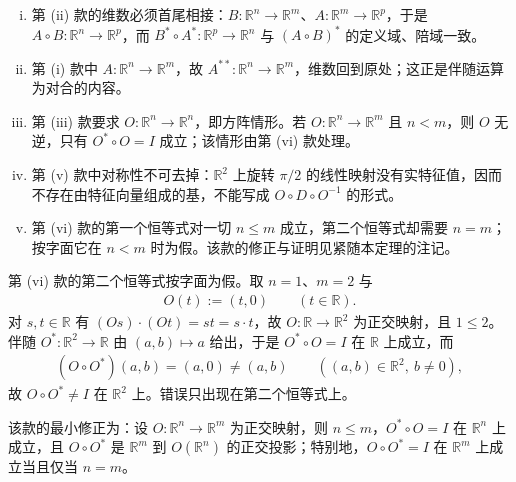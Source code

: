 \documentclass[../../main.tex]{subfiles}%
\begin{document}
\begin{remark}\label{remark:ch03-thm-3-4-条件}
\begin{enumerate}[(i)]
\item 第 (ii) 款的维数必须首尾相接：$B:\mathbb{R}^n\to\mathbb{R}^m$、$A:\mathbb{R}^m\to\mathbb{R}^p$，于是 $A\circ B:\mathbb{R}^n\to\mathbb{R}^p$，而 $B^*\circ A^*:\mathbb{R}^p\to\mathbb{R}^n$ 与 $(A\circ B)^*$ 的定义域、陪域一致。
\item 第 (i) 款中 $A:\mathbb{R}^n\to\mathbb{R}^m$，故 $A^{**}:\mathbb{R}^n\to\mathbb{R}^m$，维数回到原处；这正是伴随运算为对合的内容。
\item 第 (iii) 款要求 $O:\mathbb{R}^n\to\mathbb{R}^n$，即方阵情形。若 $O:\mathbb{R}^n\to\mathbb{R}^m$ 且 $n<m$，则 $O$ 无逆，只有 $O^*\circ O=I$ 成立；该情形由第 (vi) 款处理。
\item 第 (v) 款中对称性不可去掉：$\mathbb{R}^2$ 上旋转 $\pi/2$ 的线性映射没有实特征值，因而不存在由特征向量组成的基，不能写成 $O\circ D\circ O^{-1}$ 的形式。
\item 第 (vi) 款的第一个恒等式对一切 $n\leqslant m$ 成立，第二个恒等式却需要 $n=m$；按字面它在 $n<m$ 时为假。该款的修正与证明见紧随本定理的注记。
\end{enumerate}
\end{remark}

\begin{remark}\label{remark:ch03-thm-3-4-修正}
第 (vi) 款的第二个恒等式按字面为假。取 $n=1$、$m=2$ 与
\begin{align*}
O(t):=(t,0)\qquad(t\in\mathbb{R}).
\end{align*}
对 $s,t\in\mathbb{R}$ 有 $(Os)\cdot(Ot)=st=s\cdot t$，故 $O:\mathbb{R}\to\mathbb{R}^2$ 为正交映射，且 $1\leqslant2$。伴随 $O^*:\mathbb{R}^2\to\mathbb{R}$ 由 $(a,b)\mapsto a$ 给出，于是 $O^*\circ O=I$ 在 $\mathbb{R}$ 上成立，而
\begin{align*}
(O\circ O^*)(a,b)=(a,0)\neq(a,b)\qquad((a,b)\in\mathbb{R}^2,\ b\neq0),
\end{align*}
故 $O\circ O^*\neq I$ 在 $\mathbb{R}^2$ 上。错误只出现在第二个恒等式上。

该款的最小修正为：设 $O:\mathbb{R}^n\to\mathbb{R}^m$ 为正交映射，则 $n\leqslant m$，$O^*\circ O=I$ 在 $\mathbb{R}^n$ 上成立，且 $O\circ O^*$ 是 $\mathbb{R}^m$ 到 $O(\mathbb{R}^n)$ 的正交投影；特别地，$O\circ O^*=I$ 在 $\mathbb{R}^m$ 上成立当且仅当 $n=m$。
\end{remark}
\end{document}
